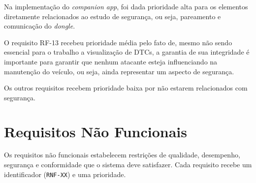 Na implementação do \textit{companion app}, foi dada prioridade alta para os elementos diretamente relacionados ao estudo de segurança, ou seja, pareamento e comunicação do \textit{dongle}.

O requisito RF-13 recebeu prioridade média pelo fato de, mesmo não sendo essencial para o trabalho a visualização de DTCs, a garantia de sua integridade é importante para garantir que nenhum atacante esteja influenciando na manutenção do veículo, ou seja, ainda representar um aspecto de segurança.

Os outros requisitos recebem prioridade baixa por não estarem relacionados com segurança.

 
\section{Requisitos Não Funcionais}
 
Os requisitos não funcionais estabelecem restrições de qualidade, desempenho,
segurança e conformidade que o sistema deve satisfazer. Cada requisito recebe um
identificador (\texttt{RNF-XX}) e uma prioridade.


